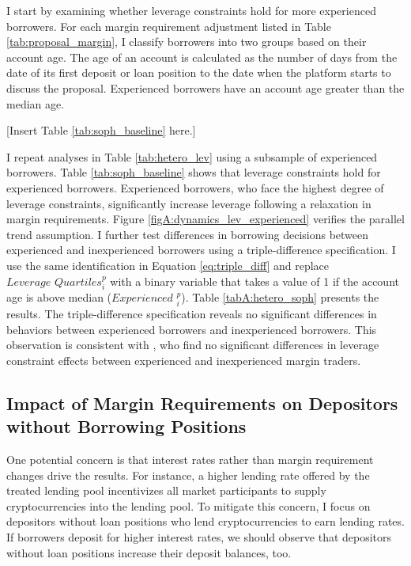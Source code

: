 \documentclass[12pt]{article}
\begin{document}
I start by examining whether leverage constraints hold for more experienced borrowers. For each margin requirement adjustment listed in Table \ref{tab:proposal_margin}, I classify borrowers into two groups based on their account age. The age of an account is calculated as the number of days from the date of its first deposit or loan position to the date when the platform starts to discuss the proposal. Experienced borrowers have an account age greater than the median age. 

\centerline{[Insert Table \ref{tab:soph_baseline} here.]}

I repeat analyses in Table \ref{tab:hetero_lev} using a subsample of experienced borrowers. Table \ref{tab:soph_baseline} shows that leverage constraints hold for experienced borrowers. Experienced borrowers, who face the highest degree of leverage constraints, significantly increase leverage following a relaxation in margin requirements. Figure \ref{figA:dynamics_lev_experienced} verifies the parallel trend assumption. I further test differences in borrowing decisions between experienced and inexperienced borrowers using a triple-difference specification. I use the same identification in Equation \ref{eq:triple_diff} and replace $\textit{Leverage Quartiles}_{i}^p$ with a binary variable that takes a value of 1 if the account age is above median ($\textit{Experienced }_{i}^p$). Table \ref{tabA:hetero_soph} presents the results. The triple-difference specification reveals no significant differences in behaviors between experienced borrowers and inexperienced borrowers. This observation is consistent with \cite{bian2021margin}, who find no significant differences in leverage constraint effects between experienced and inexperienced margin traders.


\subsection{Impact of Margin Requirements on Depositors without Borrowing Positions}

 One potential concern is that interest rates rather than margin requirement changes drive the results. For instance, a higher lending rate offered by the treated lending pool incentivizes all market participants to supply cryptocurrencies into the lending pool. To mitigate this concern, I focus on depositors without loan positions who lend cryptocurrencies to earn lending rates. If borrowers deposit for higher interest rates, we should observe that depositors without loan positions increase their deposit balances, too.
\end{document}
